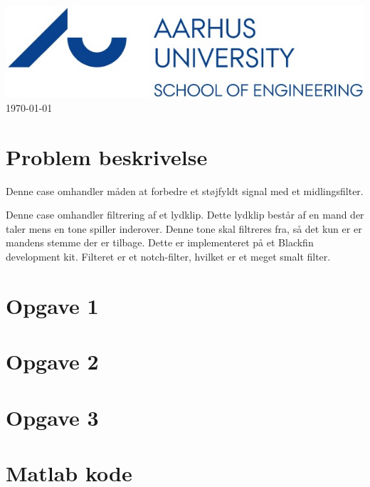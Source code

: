 \documentclass[12pt]{article}
\begin{document}
\begin{titlepage}

\includegraphics[scale=0.5]{Img/logo.jpg}\\[1cm]


{\large \today}\\[0.5cm] %


\vfill %

\end{titlepage}

\newpage
\tableofcontents
\newpage
\listoffigures
\newpage

\hypersetup{linkcolor=blue}

\section{Problem beskrivelse}
\begin{flushleft}
	
	
	Denne case omhandler måden at forbedre et støjfyldt signal med et midlingsfilter. 
	
	
	Denne case omhandler filtrering af et lydklip. Dette lydklip består af en mand der taler mens en tone spiller inderover. Denne tone skal filtreres fra, så det kun er er mandens stemme der er tilbage. 
	Dette er implementeret på et Blackfin development kit. Filteret er et notch-filter, hvilket er et meget smalt filter.
\end{flushleft}

\section{Opgave 1}

\section{Opgave 2}

\section{Opgave 3}

\section{Matlab kode}	
\end{document}

